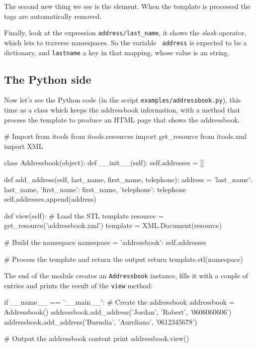 The second new thing we see is the {\tt <stl:block>} element. When the
template is processed the {\tt <stl:block>} tags are automatically
removed.

Finally, look at the expression {\tt address/last\_name}, it shows the {\em
slash} operator, which lets to traverse namespaces. So the variable {\tt
address} is expected to be a dictionary, and {\tt lastname} a key in that
mapping, whose value is an string.

\subsection{The Python side}

Now let's see the Python code (in the script {\tt examples/addressbook.py}),
this time as a class which keeps the addressbook information, with a method
that process the template to produce an HTML page that shows the addressbook.

\begin{code}
    # Import from itools
    from itools.resources import get_resource
    from itools.xml import XML


    class Addressbook(object):
        def __init__(self):
            self.addresses = []


        def add_address(self, last_name, first_name, telephone):
            address = {'last_name': last_name,
                       'first_name': first_name,
                       'telephone': telephone}
            self.addresses.append(address)


        def view(self):
            # Load the STL template
            resource = get_resource('addressbook.xml')
            template = XML.Document(resource)

            # Build the namespace
            namespace = {'addressbook': self.addresses}

            # Process the template and return the output
            return template.stl(namespace)
\end{code}

The end of the module creates an {\tt Addressbook} instance, fills it with
a couple of entries and prints the result of the {\tt view} method:

\begin{code}
    if __name__ == '__main__':
        # Create the addressbook
        addressbook = Addressbook()
        addressbook.add_address('Jordan', 'Robert', '0606060606')
        addressbook.add_address('Buendia', 'Aureliano', '0612345678')

        # Output the addressbook content
        print addressbook.view()
\end{code}

